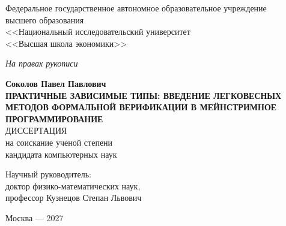 \begin{center}
Федеральное государственное автономное образовательное
учреждение \\
высшего образования \\
<<Национальный исследовательский университет \\
<<Высшая школа экономики>> \\\vspace{1.5em}
\begin{flushright}
\textit{На правах рукописи}
\end{flushright}
\vfill
\textbf{
    Соколов Павел Павлович \\\vspace{2em}
    \MakeUppercase{
        Практичные зависимые типы: введение легковесных
        методов формальной верификации в мейнстримное
        программирование \\\vspace{5em}
    }
}
\MakeUppercase{Диссертация} \\
на соискание ученой степени \\
кандидата компьютерных наук \\\vspace{5em}
\begin{flushright}
Научный руководитель: \\
доктор физико-математических наук, \\
профессор Кузнецов Степан Львович \\
\end{flushright}
\vfill
Москва --- 2027
\end{center}
